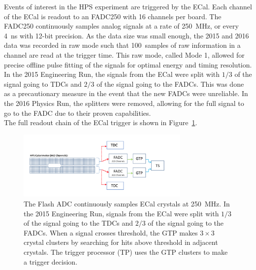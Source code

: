 Events of interest in the HPS experiment are triggered by the ECal. Each channel of the ECal is readout to an FADC250 with 16 channels per board. The FADC250 continuously samples analog signals at a rate of 250~MHz, or every 4~ns with 12-bit precision. As the data size was small enough, the 2015 and 2016 data was recorded in raw mode such that 100~samples of raw information in a channel are read at the trigger time. This raw mode, called Mode 1, allowed for precise offline pulse fitting of the signals for optimal energy and timing resolution. In the 2015 Engineering Run, the signals from the ECal were split with $1/3$ of the signal going to TDCs and $2/3$ of the signal going to the FADCs. This was done as a precautionary measure in the event that the new FADCs were unreliable. In the 2016 Physics Run, the splitters were removed, allowing for the full signal to go to the FADC due to their proven capabilities. \\
\indent The full readout chain of the ECal trigger is shown in Figure~\ref{Figure:readoutChain}.
\begin{figure}[thb]
  \centering
      \includegraphics[width=0.75\textwidth]{pics/experiment/readoutChain.png}
  \caption[ECal readout chain]{The Flash ADC continuously samples ECal crystals at 250~MHz. In the 2015 Engineering Run, signals from the ECal were split with $1/3$ of the signal going to the TDCs and $2/3$ of the signal going to the FADCs. When a signal crosses threshold, the GTP makes $3\times3$ crystal clusters by searching for hits above threshold in adjacent crystals. The trigger processor (TP) uses the GTP clusters to make a trigger decision.}
  \label{Figure:readoutChain}
\end{figure}

